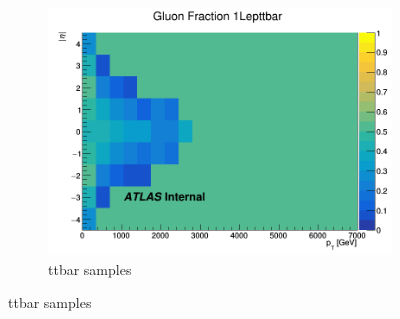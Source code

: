 \begin{figure}[p]
\begin{subfigure}[b]{0.3\textwidth}
        \centering
        \includegraphics[width=\textwidth]{figures/QGfrac/GluonFrac2D_1Lepttbar.png}
        \caption{ttbar samples}
        \label{fig:GluonFracttbar}
    \end{subfigure}

    \bigskip


\end{figure}
